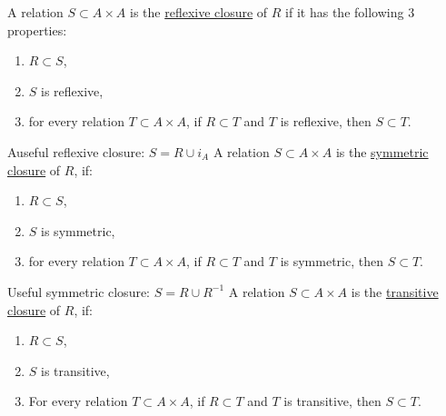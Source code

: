 \documentclass[12pt]{article}
\begin{document}
\begin{flushleft}
 	\textbullet \quad A relation $S \subset A \times A$ is the \uline{reflexive closure} of $R$ if it has the following 3 properties: 
 	\begin{enumerate}
 	\item $R \subset S$, 
 	\item $S$ is reflexive, 
 	\item for every relation $T \subset A \times A$, if $R \subset T$ and $T$ is reflexive, then $S \subset T$.  
 	\end{enumerate}
 	\textbullet \quad Auseful reflexive closure: $S = R\cup i_A $ \linebreak 
 	\textbullet \quad A relation $S \subset A \times A$ is the \uline{symmetric closure} of $R$, if:  
 	\begin{enumerate}
 	\item $R\subset S$, 
 	\item $S$ is symmetric, 
 	\item for every relation $T\subset A \times A$, if $R\subset T$ and $T$ is symmetric, then $S \subset T$.  
 	\end{enumerate}
 	\textbullet \quad Useful symmetric closure: $S = R \cup R^{-1}$ \linebreak 
 	\textbullet \quad A relation $S \subset A \times A$ is the \uline{transitive closure} of $R$, if:  
 	\begin{enumerate}
 	\item $R \subset S$, 
 	\item $S$ is transitive, 
 	\item For every relation $T\subset A \times A$, if $R \subset T$ and $T$ is transitive, then $S \subset T$.  
 	\end{enumerate}
 	

\end{flushleft}
\end{document}

